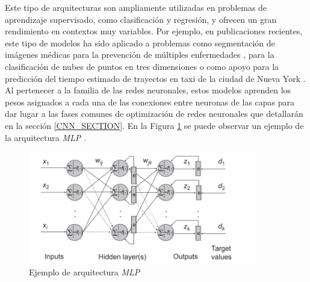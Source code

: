 Este tipo de arquitecturas son ampliamente utilizadas en problemas de aprendizaje supervisado, como clasificación y regresión, y ofrecen un gran rendimiento en contextos muy variables. Por ejemplo, en publicaciones recientes, este tipo de modelos ha sido aplicado a problemas como segmentación de imágenes médicas para la prevención de múltiples enfermedades \cite{valanarasu2022unext}, para la clasificación de nubes de puntos en tres dimensiones \cite{choe2022pointmixer} o como apoyo para la predicción del tiempo estimado de trayectos en taxi de la ciudad de Nueva York \cite{poongodi2022new}. Al pertenecer a la familia de las redes neuronales, estos modelos aprenden los pesos asignados a cada una de las conexiones entre neuronas de las capas para dar lugar a las fases comunes de optimización de redes neuronales que detallarán en la sección \ref{CNN_SECTION}. En la Figura \ref{MLP_BACKGROUND} se puede observar un ejemplo de la arquitectura \textit{MLP} \cite{PEDRO2017111}.

\begin{figure}[H]
	\centering
	\includegraphics[width=10cm]{Figures/Background/MLP.png}
	\caption{Ejemplo de arquitectura \textit{MLP}}
	\label{MLP_BACKGROUND}
\end{figure}



